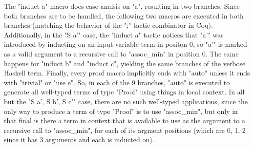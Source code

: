 The "induct a" macro does case analsis on "a", resulting in two branches. Since both branches are to be handled, the following two macros are executed in both branches (matching the behavior of the ";" tactic combinator in Coq).
Additionally, in the "S a'" case, the "induct a" tactic notices that "a'" was introduced by inducting on an input variable term in positon 0, so "a'" is marked as a valid argument to a recursive call to "assoc\_min" in position 0.
The same happens for "induct b" and "induct c", yielding the same branches of the verbose Haskell term.
Finally, every proof macro implicitly ends with "auto" unless it ends with "trivial" or "use e".
So, in each of the 9 branches, "auto" is executed to generate all well-typed terms of type "Proof" using things in local context.
In all but the "S a', S b', S c'" case, there are no such well-typed applications, since the only way to produce a term of type "Proof" is to use "assoc\_min", but only in that final is there a term in context that is available to use as the argument to a recursive call to "assoc\_min", for each of its argment positions (which are 0, 1, 2 since it has 3 arguments and each is inducted on).


